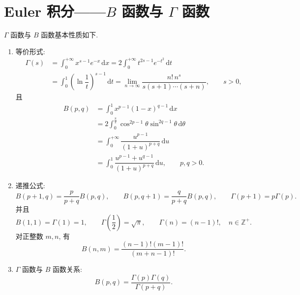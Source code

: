 \newpage

\section{\texorpdfstring{Euler 积分——$B$ 函数与 $\Gamma$ 函数}{Euler 积分——B 函数与 Gamma 函数}}

\begin{proposition}[\markstar]
    $\Gamma$ 函数与 $B$ 函数基本性质如下.

    \begin{enumerate}
        \item 等价形式:
              \begin{align*}
                  \Gamma(s)
                   & =\int_0^{+\infty}x^{s-1}e^{-x}\,\mathrm{d}x
                  =2\int_0^{+\infty}t^{2s-1}e^{-t^2}\,\mathrm{d}t             \\
                   & =\int_0^1\left(\ln\dfrac{1}{t}\right)^{s-1}\,\mathrm{d}t
                  =\lim\limits_{n\to\infty}\dfrac{n!\,n^s}{s(s+1)\cdots(s+n)},\qquad s>0,
              \end{align*}
              且
              \begin{align*}
                  B(p,q)
                   & =\int_0^1x^{p-1}(1-x)^{q-1}\,\mathrm{d}x                                     \\
                   & =2\int_0^{\frac{\pi}{2}}\cos^{2p-1}\theta\sin^{2q-1}\theta\,\mathrm{d}\theta \\
                   & =\int_0^{+\infty}\dfrac{u^{p-1}}{(1+u)^{p+q}}\,\mathrm{d}u                   \\
                   & =\int_0^1\dfrac{u^{p-1}+u^{q-1}}{(1+u)^{p+q}}\,\mathrm{d}u,
                  \qquad p,q>0.
              \end{align*}

        \item 递推公式:
              \[
                  B(p+1,q)=\dfrac{p}{p+q}B(p,q),\qquad
                  B(p,q+1)=\dfrac{q}{p+q}B(p,q),\qquad
                  \Gamma(p+1)=p\Gamma(p).
              \]
              并且
              \[
                  B(1,1)=\Gamma(1)=1,\qquad
                  \Gamma\left(\dfrac{1}{2}\right)=\sqrt{\pi},\qquad
                  \Gamma(n)=(n-1)!,\quad n\in\mathbb{Z}^+.
              \]
              对正整数 $m,n$, 有
              \[
                  B(n,m)=\dfrac{(n-1)!(m-1)!}{(m+n-1)!}.
              \]

        \item $\Gamma$ 函数与 $B$ 函数关系:
              \[
                  B(p,q)=\dfrac{\Gamma(p)\Gamma(q)}{\Gamma(p+q)}.
              \]


\end{enumerate}
\end{proposition}
